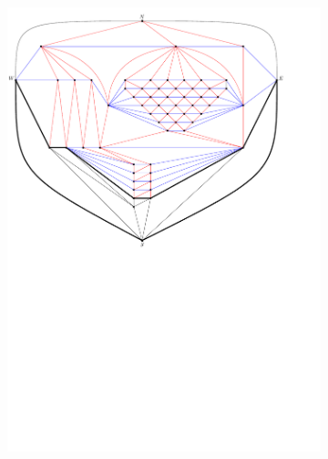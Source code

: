 \begin{figure}
    \ContinuedFloat
    \begin{subfigure}[b]{.9 \textwidth}
      \includegraphics[width=\textwidth]{examples/img/vertWorstCase/sweep7}
      \caption{}
      \label{fig:ex:vert:sweep7}
    \end{subfigure}
    ~
    \begin{subfigure}[b]{.9 \textwidth}

\end{subfigure}
\end{figure}
